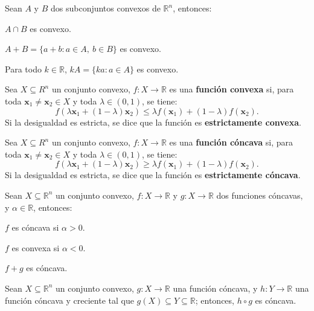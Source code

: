 \documentclass[8pt,a4paper]{extarticle}
\begin{document}
\begin{multicols}{3}
	\begin{boxprop}
		Sean $A$ y $B$ dos subconjuntos convexos de $\mathbb{R}^n$, entonces:
		\begin{eqlist}
			\item $A \cap B$ es convexo.
			\item $A + B = \{a + b : a \in A,\ b \in B\}$ es convexo.
			\item Para todo $k \in \mathbb{R}$, $kA = \{ka : a\in A\}$ es convexo.
		\end{eqlist}
	\end{boxprop}

	\begin{boxdef}
		Sea $X \subseteq R^n$ un conjunto convexo, $f : X \to \mathbb{R}$ es una \textbf{función convexa} si, para toda $\mathbf{x}_1 \neq \mathbf{x}_2 \in X$ y toda $\lambda \in (0, 1)$, se tiene:
		\[
			f(\lambda \mathbf{x}_1 + (1 - \lambda)\mathbf{x}_2) \le \lambda f(\mathbf{x}_1) + (1 - \lambda) f(\mathbf{x}_2)
			.\]
		Si la desigualdad es estricta, se dice que la función es \textbf{estrictamente convexa}.
	\end{boxdef}

	\begin{boxdef}
		Sea $X \subseteq R^n$ un conjunto convexo, $f : X \to \mathbb{R}$ es una \textbf{función cóncava} si, para toda $\mathbf{x}_1 \neq \mathbf{x}_2 \in X$ y toda $\lambda \in (0, 1)$, se tiene:
		\[
			f(\lambda \mathbf{x}_1 + (1 - \lambda)\mathbf{x}_2) \ge \lambda f(\mathbf{x}_1) + (1 - \lambda) f(\mathbf{x}_2)
			.\]
		Si la desigualdad es estricta, se dice que la función es \textbf{estrictamente cóncava}.
	\end{boxdef}

	\begin{boxprop}
		Sean $X \subseteq \mathbb{R}^n$ un conjunto convexo, $f : X \to \mathbb{R}$ y $g : X \to \mathbb{R}$ dos funciones cóncavas, y $\alpha \in \mathbb{R}$, entonces:
		\begin{eqlist}
			\item $f$ es cóncava si $\alpha > 0$.
			\item $f$ es convexa si $\alpha < 0$.
			\item $f+g$ es cóncava.
		\end{eqlist}
	\end{boxprop}

	\begin{boxprop}
		Sean $X \subseteq \mathbb{R}^n$ un conjunto convexo, $g : X \to \mathbb{R}$ una función cóncava, y $h : Y \to \mathbb{R}$ una función cóncava y creciente tal que $g(X) \subseteq Y \subseteq \mathbb{R}$; entonces, $h \circ g$ es cóncava.
	\end{boxprop}


\end{multicols}
\end{document}
